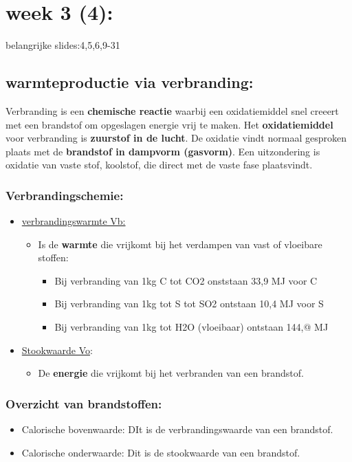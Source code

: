 \documentclass[12pt]{article}
\begin{document}
\section{week 3 (4):}
belangrijke slides:4,5,6,9-31
\subsection{warmteproductie via verbranding:}
Verbranding is een \textbf{chemische reactie} waarbij een oxidatiemiddel snel creeert met een brandstof om opgeslagen energie vrij te maken. Het \textbf{oxidatiemiddel} voor verbranding is \textbf{zuurstof in de lucht}. De oxidatie vindt normaal gesproken plaats met de \textbf{brandstof in dampvorm (gasvorm)}. Een uitzondering is oxidatie van vaste stof, koolstof, die direct met de vaste fase plaatsvindt. 
\subsubsection{Verbrandingschemie:}
\begin{itemize}
    \item \underline{verbrandingswarmte Vb:}\begin{itemize}
        \item Is de \textbf{warmte} die vrijkomt bij het verdampen van vast of vloeibare stoffen:\begin{itemize}
            \item Bij verbranding van 1kg C tot CO2 onststaan 33,9 MJ voor C
            \item Bij verbranding van 1kg tot S tot SO2 ontstaan 10,4 MJ voor S 
            \item Bij verbranding van 1kg tot H2O (vloeibaar) ontstaan 144,@ MJ
        \end{itemize}
    \end{itemize}
    \item \underline{Stookwaarde Vo}:\begin{itemize}
        \item De \textbf{energie} die vrijkomt bij het verbranden van een brandstof.
    \end{itemize}
\end{itemize}
\subsubsection{Overzicht van brandstoffen:}
\begin{itemize}
    \item Calorische bovenwaarde: DIt is de verbrandingswaarde van een brandstof.
    \item Calorische onderwaarde: Dit is de stookwaarde van een brandstof.
\end{itemize}
\end{document}
